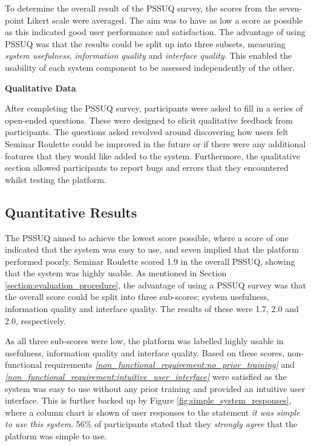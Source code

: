 \documentclass{l4proj}
\begin{document}
To determine the overall result of the PSSUQ survey, the scores from the seven-point Likert scale were averaged. The aim was to have as low a score as possible as this indicated good user performance and satisfaction. The advantage of using PSSUQ was that the results could be split up into three subsets, measuring \emph{system usefulness}, \emph{information quality} and \emph{interface quality}. This enabled the usability of each system component to be assessed independently of the other.

\textbf{Qualitative Data}

After completing the PSSUQ survey, participants were asked to fill in a series of open-ended questions. These were designed to elicit qualitative feedback from participants. The questions asked revolved around discovering how users felt Seminar Roulette could be improved in the future or if there were any additional features that they would like added to the system. Furthermore, the qualitative section allowed participants to report bugs and errors that they encountered whilst testing the platform.

\subsection{Quantitative Results}

The PSSUQ aimed to achieve the lowest score possible, where a score of one indicated that the system was easy to use, and seven implied that the platform performed poorly. Seminar Roulette scored 1.9 in the overall PSSUQ, showing that the system was highly usable. As mentioned in Section \ref{section:evaluation_procedure}, the advantage of using a PSSUQ survey was that the overall score could be split into three sub-scores; system usefulness, information quality and interface quality. The results of these were 1.7, 2.0 and 2.0, respectively.

As all three sub-scores were low, the platform was labelled highly usable in usefulness, information quality and interface quality. Based on these scores, non-functional requirements \emph{\ref{non_functional_requirement:no_prior_training}} and \emph{\ref{non_functional_requirement:intuitive_user_interface}} were satisfied as the system was easy to use without any prior training and provided an intuitive user interface. This is further backed up by Figure \ref{fig:simple_system_responses}, where a column chart is shown of user responses to the statement \emph{it was simple to use this system}. 56\% of participants stated that they \emph{strongly agree} that the platform was simple to use.
\end{document}
